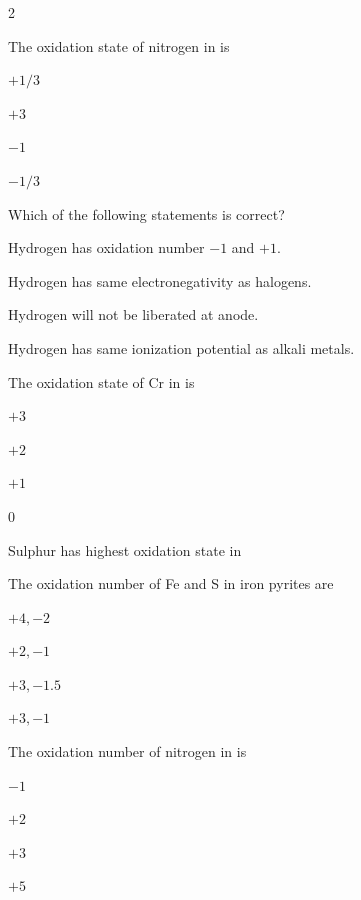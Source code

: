 \documentclass[10pt,a4paper]{article}
\begin{document}
\begin{multicols}{2}
\begin{questions}[start=1]
\item The oxidation state of nitrogen in  is
\begin{options}
  \item $+1/3$
  \item $+3$
  \item $-1$
  \item $-1/3$
\end{options}

\item Which of the following statements is correct?
\begin{options}
  \item Hydrogen has oxidation number $-1$ and $+1$.
  \item Hydrogen has same electronegativity as halogens.
  \item Hydrogen will not be liberated at anode.
  \item Hydrogen has same ionization potential as alkali metals.
\end{options}

\item The oxidation state of Cr in \ce{[Cr(NH3)4Cl2]+} is
\begin{options}
  \item $+3$
  \item $+2$
  \item $+1$
  \item 0
\end{options}

\item Sulphur has highest oxidation state in
\begin{options}
  \item {}
  \item {}
  \item {}
  \item {}
\end{options}

\item The oxidation number of Fe and S in iron pyrites are
\begin{options}
  \item $+4, -2$
  \item $+2, -1$
  \item $+3, -1.5$
  \item $+3, -1$
\end{options}

\item The oxidation number of nitrogen in  is
\begin{options}
  \item $-1$
  \item $+2$
  \item $+3$
  \item $+5$
\end{options}


\end{questions}
\end{multicols}
\end{document}
